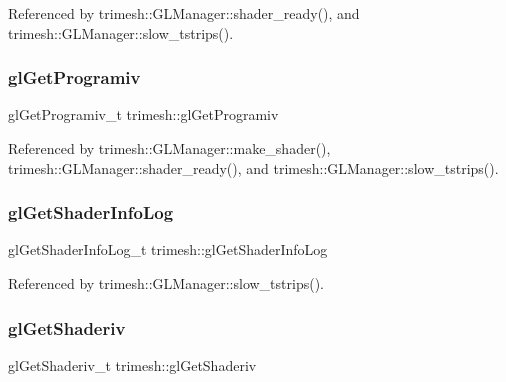 Referenced by trimesh\+::\+G\+L\+Manager\+::shader\+\_\+ready(), and trimesh\+::\+G\+L\+Manager\+::slow\+\_\+tstrips().

\mbox{\label{namespacetrimesh_a2eabc86d273e5c75453c47f6b31f0ca8}} 
\subsubsection{\texorpdfstring{gl\+Get\+Programiv}{glGetProgramiv}}
{\footnotesize\ttfamily gl\+Get\+Programiv\+\_\+t trimesh\+::gl\+Get\+Programiv\hspace{0.3cm}{\ttfamily [static]}}



Referenced by trimesh\+::\+G\+L\+Manager\+::make\+\_\+shader(), trimesh\+::\+G\+L\+Manager\+::shader\+\_\+ready(), and trimesh\+::\+G\+L\+Manager\+::slow\+\_\+tstrips().

\mbox{\label{namespacetrimesh_a0d55575f5297e8534e2e631105ee6f99}} 
\subsubsection{\texorpdfstring{gl\+Get\+Shader\+Info\+Log}{glGetShaderInfoLog}}
{\footnotesize\ttfamily gl\+Get\+Shader\+Info\+Log\+\_\+t trimesh\+::gl\+Get\+Shader\+Info\+Log\hspace{0.3cm}{\ttfamily [static]}}



Referenced by trimesh\+::\+G\+L\+Manager\+::slow\+\_\+tstrips().

\mbox{\label{namespacetrimesh_ae9c0544f820aa851b6397d1432a5d34c}} 
\subsubsection{\texorpdfstring{gl\+Get\+Shaderiv}{glGetShaderiv}}
{\footnotesize\ttfamily gl\+Get\+Shaderiv\+\_\+t trimesh\+::gl\+Get\+Shaderiv\hspace{0.3cm}{\ttfamily [static]}}




